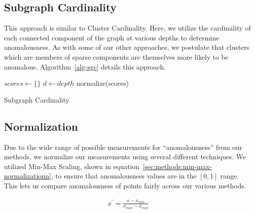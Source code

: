 \subsection{Subgraph Cardinality}

This approach is similar to Cluster Cardinality.
Here,  we utilize the cardinality of each connected component of the graph at various depths to determine anomalousness.
As with some of our other approaches, we postulate that clusters which are members of sparse components are themselves more likely to be anomalous.
Algorithm~\ref{alg-sgc} details this approach.

\begin{algorithm}
\DontPrintSemicolon
\SetAlgoLined
{}
 $scores \leftarrow \{\}$\;
 $d \leftarrow depth$\;
 normalize(scores)\;
 \caption{Subgraph Cardinality}
 \label{alg-sgc}
\end{algorithm}

\subsection{Normalization}

Due to the wide range of possible measurements for ``anomalousness'' from our methods, we normalize our measurements using several different techniques.
We utilized Min-Max Scaling, shown in equation~\ref{sec:methods:min-max-normalizationn}, to ensure that anomalousness values are in the $[0, 1]$ range.
This lets us compare anomalousness of points fairly across our various methods.

\begin{gather}
x^{\prime} = \frac{x - x_{min}}{x_{max} - x_{min}}
\label{sec:methods:min-max-normalizationn}
\end{gather}
